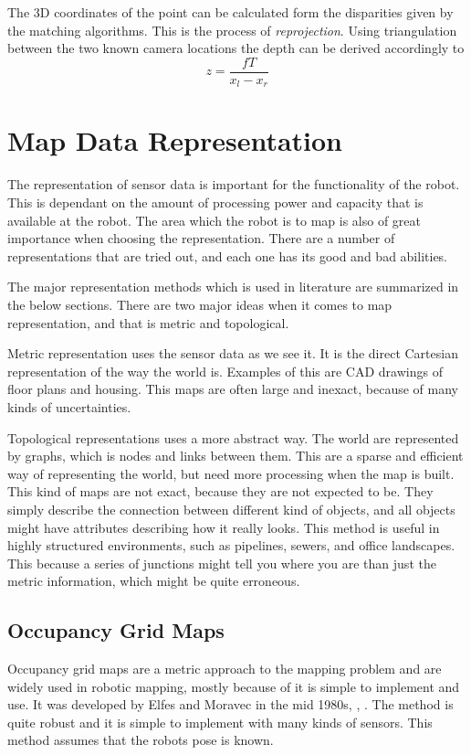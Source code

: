 The 3D coordinates of the point can be calculated form the disparities given by the
matching algorithms. This is the process of \emph{reprojection}. Using triangulation
between the two known camera locations the depth can be derived accordingly to 
\begin{equation}
    z = \frac{f T}{x_l - x_r}
\end{equation}



\section{Map Data Representation}
The representation of sensor data is important for the functionality of the robot. This is
dependant on the amount of processing power and capacity that is available at the robot.
The area which the robot is to map is also of great importance when choosing the
representation. There are a number of representations that are tried out, and each one has its good and
bad abilities. 

The major representation methods which is used in literature are summarized in the below
sections. There are two major ideas when it comes to map representation, and that is
metric and topological.

Metric representation uses the sensor data as we see it. It is the direct Cartesian
representation of the way the world is. Examples of this are CAD drawings of floor plans
and housing. This maps are often large and inexact, because of many kinds of
uncertainties.

Topological representations uses a more abstract way. The world are represented by graphs,
which is nodes and links between them. This are a sparse and efficient way of representing
the world, but need more processing when the map is built. This kind of maps are not
exact, because they are not expected to be. They simply describe the connection between
different kind of objects, and all objects might have attributes describing how it really
looks. This method is useful in highly structured environments, such as pipelines, sewers,
and office landscapes. This because a series of junctions might tell you where you are
than just the metric information, which might be quite erroneous. 


\subsection{Occupancy Grid Maps}
Occupancy grid maps are a metric approach to the mapping problem and are widely used in 
robotic mapping, mostly because of it is simple to implement and use. It was developed 
by Elfes and Moravec in the mid 1980s, \cite{elfes}, \cite{moravec}. The method is quite 
robust and it is simple to implement with many kinds of sensors. This method assumes that 
the robots pose is known.

